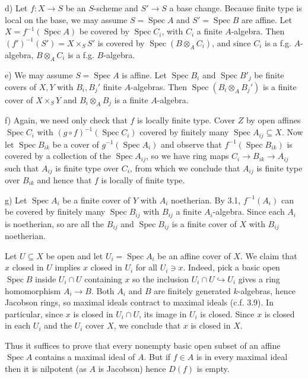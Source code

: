 \documentclass{report}
\DeclareMathOperator{\Spec}{Spec}
\begin{document}
\noindent
d)	Let $f:X\rightarrow S$ be an $S$-scheme and $S'\rightarrow S$ a base change.
Because finite type is local on the base, we may assume $S=\Spec A$ and $S'=\Spec B$
are affine.	Let $X=f^{-1}(\Spec A)$ be covered by $\Spec C_i$, with $C_i$ a finite $A$-algebra.
Then $(f')^{-1}(S')=X\times_S S'$ is covered by $\Spec (B\otimes_A C_i)$, and since
$C_i$ is a f.g. $A$-algebra, $B\otimes_A C_i$ is a f.g. $B$-algebra.

\noindent
e)	We may assume $S=\Spec A$ is affine.  Let $\Spec B_i$ and $\Spec B'_j$ be finite covers of $X,Y$
with $B_i,B_j'$ finite $A$-algebras.  Then $\Spec (B_i\otimes_A B_j')$ is a finite cover of $X\times_S Y$
and $B_i\otimes_A B_j$ is a finite $A$-algebra.

\noindent
f)	Again, we need only check that $f$ is locally finite type.	Cover $Z$
by open affines $\Spec C_i$ with $(g\circ f)^{-1}(\Spec C_i)$ covered by finitely many 
$\Spec A_{ij}\subseteq X$.	Now let $\Spec B_{ik}$ be a cover of $g^{-1}(\Spec A_i)$
and observe that $f^{-1}(\Spec B_{ik})$ is covered by a collection of the $\Spec A_{ij}$,
so we have ring maps $C_i\rightarrow B_{ik}\rightarrow A_{ij}$
such that $A_{ij}$ is finite type over $C_i$, from which we conclude that $A_{ij}$ is finite type over $B_{ik}$
and hence that $f$ is locally of finite type.
	

\noindent
g) Let $\Spec A_i$ be a finite cover of $Y$ with $A_i$ noetherian.  By 3.1, $f^{-1}(A_i)$ can be covered by 
finitely many $\Spec B_{ij}$  with $B_{ij}$ a finite $A_i$-algebra.	Since each $A_i$ is noetherian, so are
all the $B_{ij}$ and $\Spec B_{ij}$ is a finite cover of $X$ with $B_{ij}$ noetherian.	

\bigskip
{}	Let $U\subseteq X$ be open and let $U_i=\Spec A_i$ be an affine cover of $X$.
We claim that $x$ closed in $U$ implies $x$ closed in $U_i$ for all $U_i\ni x$.
Indeed, pick a basic open $\Spec B$ inside $U_i\cap U$ containing $x$ so the
inclusion $U_i\cap U\hookrightarrow U_i$ gives a ring homomorphism $A_i\rightarrow B$.
Both $A_i$ and $B$ are finitely generated $k$-algebras, hence Jacobson rings,
so maximal ideals contract to maximal ideals (c.f. 3.9).  In particular, since $x$
is closed in $U_i\cap U$, its image in $U_i$ is closed.  Since $x$ is closed in 
each $U_i$ and the $U_i$ cover $X$, we conclude that $x$ is closed in $X$.

Thus it suffices to prove that every nonempty basic open subset of an affine $\Spec A$ contains
a maximal ideal of $A$.  But if $f\in A$ is in every maximal ideal then it is nilpotent (as $A$ is Jacobson)
hence $D(f)$ is empty.  
\end{document}

